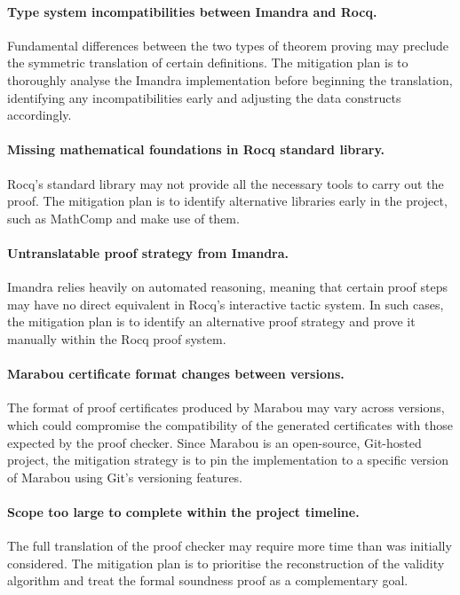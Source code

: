 \paragraph*{Type system incompatibilities between Imandra and Rocq.} Fundamental differences between the two types of theorem proving may preclude the symmetric translation of certain definitions. The mitigation plan is to thoroughly analyse the Imandra implementation before beginning the translation, identifying any incompatibilities early and adjusting the data constructs accordingly.

\paragraph*{Missing mathematical foundations in Rocq standard library.} Rocq's standard library may not provide all the necessary tools to carry out the proof. The mitigation plan is to identify alternative libraries early in the project, such as MathComp and make use of them.

\paragraph*{Untranslatable proof strategy from Imandra.} Imandra relies heavily on automated reasoning, meaning that certain proof steps may have no direct equivalent in Rocq's interactive tactic system. In such cases, the mitigation plan is to identify an alternative proof strategy and prove it manually within the Rocq proof system.

\paragraph*{Marabou certificate format changes between versions.} The format of proof certificates produced by Marabou may vary across versions, which could compromise the compatibility of the generated certificates with those expected by the proof checker. Since Marabou is an open-source, Git-hosted project, the mitigation strategy is to pin the implementation to a specific version of Marabou using Git's versioning features. \label{risk:marabou_version}

\paragraph*{Scope too large to complete within the project timeline.} The full translation of the proof checker may require more time than was initially considered. The mitigation plan is to prioritise the reconstruction of the validity algorithm and treat the formal soundness proof as a complementary goal.

